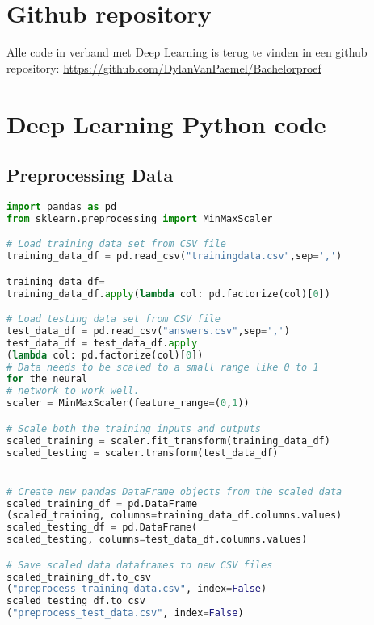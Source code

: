 
\lstlistoflistings
\section{Github repository} %

Alle code in verband met Deep Learning is terug te vinden in een github repository: \url{https://github.com/DylanVanPaemel/Bachelorproef}

\section{Deep Learning Python code} 
\subsection{Preprocessing Data} 
\begin{lstlisting}[language=Python]
import pandas as pd
from sklearn.preprocessing import MinMaxScaler

# Load training data set from CSV file
training_data_df = pd.read_csv("trainingdata.csv",sep=',')

training_data_df=
training_data_df.apply(lambda col: pd.factorize(col)[0])

# Load testing data set from CSV file
test_data_df = pd.read_csv("answers.csv",sep=',')
test_data_df = test_data_df.apply
(lambda col: pd.factorize(col)[0])
# Data needs to be scaled to a small range like 0 to 1
for the neural
# network to work well.
scaler = MinMaxScaler(feature_range=(0,1))

# Scale both the training inputs and outputs
scaled_training = scaler.fit_transform(training_data_df)
scaled_testing = scaler.transform(test_data_df)


# Create new pandas DataFrame objects from the scaled data
scaled_training_df = pd.DataFrame
(scaled_training, columns=training_data_df.columns.values)
scaled_testing_df = pd.DataFrame(
scaled_testing, columns=test_data_df.columns.values)

# Save scaled data dataframes to new CSV files
scaled_training_df.to_csv
("preprocess_training_data.csv", index=False)
scaled_testing_df.to_csv
("preprocess_test_data.csv", index=False)
\end{lstlisting}

